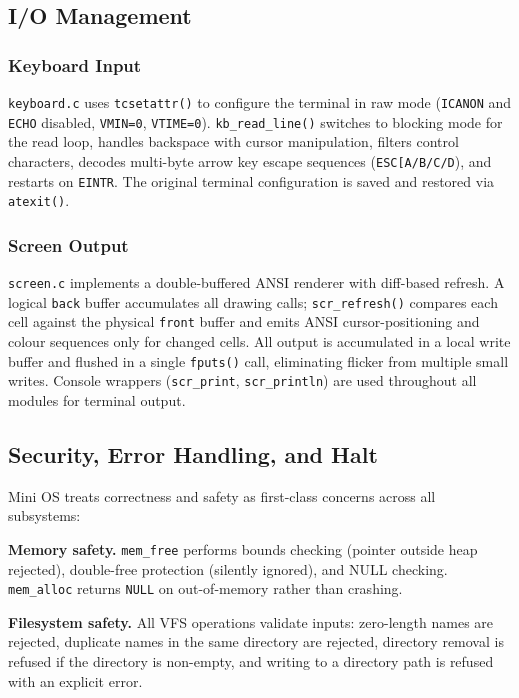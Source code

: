 \documentclass[conference]{IEEEtran}
\begin{document}
\subsection{I/O Management}

\subsubsection{Keyboard Input}

\texttt{keyboard.c} uses \texttt{tcsetattr()} to configure the terminal in raw mode (\texttt{ICANON} and \texttt{ECHO} disabled, \texttt{VMIN=0}, \texttt{VTIME=0}). \texttt{kb\_read\_line()} switches to blocking mode for the read loop, handles backspace with cursor manipulation, filters control characters, decodes multi-byte arrow key escape sequences (\texttt{ESC[A/B/C/D}), and restarts on \texttt{EINTR}. The original terminal configuration is saved and restored via \texttt{atexit()}.

\subsubsection{Screen Output}

\texttt{screen.c} implements a double-buffered ANSI renderer with diff-based refresh. A logical \texttt{back} buffer accumulates all drawing calls; \texttt{scr\_refresh()} compares each cell against the physical \texttt{front} buffer and emits ANSI cursor-positioning and colour sequences only for changed cells. All output is accumulated in a local write buffer and flushed in a single \texttt{fputs()} call, eliminating flicker from multiple small writes. Console wrappers (\texttt{scr\_print}, \texttt{scr\_println}) are used throughout all modules for terminal output.

\subsection{Security, Error Handling, and Halt}

Mini OS treats correctness and safety as first-class concerns across all subsystems:

\textbf{Memory safety.} \texttt{mem\_free} performs bounds checking (pointer outside heap rejected), double-free protection (silently ignored), and NULL checking. \texttt{mem\_alloc} returns \texttt{NULL} on out-of-memory rather than crashing.

\textbf{Filesystem safety.} All VFS operations validate inputs: zero-length names are rejected, duplicate names in the same directory are rejected, directory removal is refused if the directory is non-empty, and writing to a directory path is refused with an explicit error.
\end{document}
